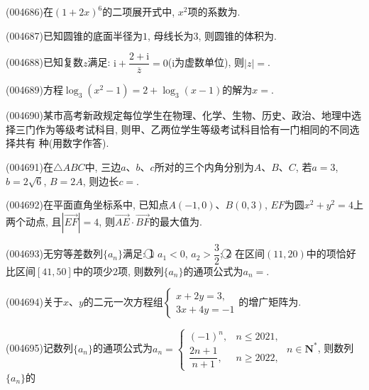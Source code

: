\item (004686)在$(1+2x)^6$的二项展开式中, $x^2$项的系数为.
\item (004687)已知圆锥的底面半径为$1$, 母线长为$3$, 则圆锥的体积为.
\item (004688)已知复数$z$满足: $\mathrm{i}+\dfrac{2+\mathrm{i}}{\overline z}=0$($\mathrm{i}$为虚数单位), 则$|z|=$.
\item (004689)方程$\log_3(x^2-1)=2+\log_3(x-1)$的解为$x=$.
\item (004690)某市高考新政规定每位学生在物理、化学、生物、历史、政治、地理中选择三门作为等级考试科目, 则甲、乙两位学生等级考试科目恰有一门相同的不同选择共有
种(用数字作答).
\item (004691)在$\triangle ABC$中, 三边$a$、$b$、$c$所对的三个内角分别为$A$、$B$、$C$, 若$a=3$, $b=2\sqrt 6$, $B=2A$, 则边长$c=$.
\item (004692)在平面直角坐标系中, 已知点$A(-1,0)$、$B(0,3)$, $EF$为圆$x^2+y^2=4$上两个动点, 且$|\overrightarrow{EF}|=4$, 则$\overrightarrow{AE}\cdot \overrightarrow{BF}$的最大值为.
\item (004693)无穷等差数列$\{a_n\}$满足: \textcircled{1} $a_1<0$, $a_2>\dfrac 32$; \textcircled{2} 在区间$(11,20)$中的项恰好比区间$[41,50]$中的项少$2$项, 则数列$\{a_n\}$的通项公式为$a_n=$.
\item (004694)关于$x$、$y$的二元一次方程组$\begin{cases}x+2y=3, \\ 3x+4y=-1 \end{cases}$的增广矩阵为.
\item (004695)记数列$\{a_n\}$的通项公式为$a_n=\begin{cases}
(-1)^n, &  n\le 2021,  \\ \dfrac{2n+1}{n+1}, &  n\ge 2022, \end{cases}$ $n\in \mathbf{N}^*$, 则数列$\{a_n\}$的
